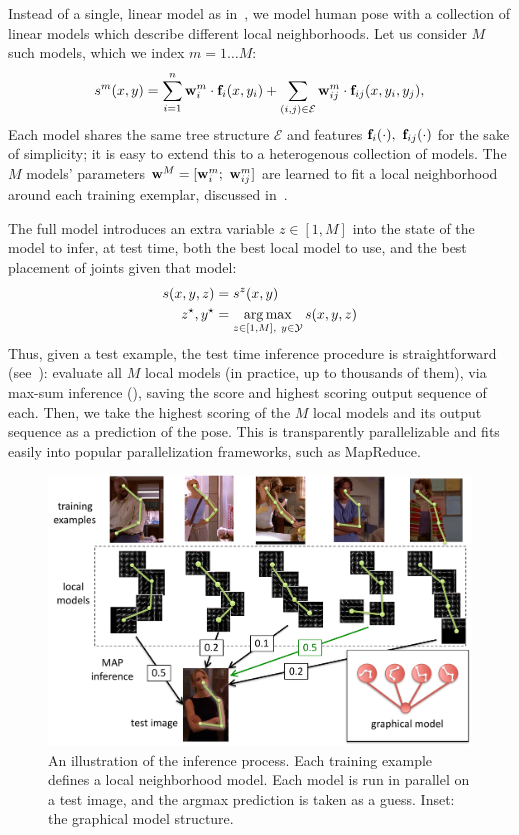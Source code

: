 Instead of a single, linear model as in~, we model human pose 
with a collection of linear models which describe different local 
neighborhoods.  Let us consider $M$ such models, which we index $m = 1 \ldots 
M$:
\begin{align}
s^m(x,y) = \sum_{i=1}^n \mathbf{w}^m_i \cdot \mathbf{f}_i(x,y_i) + \sum_{(i,j) \in \mathcal{E}} 
\mathbf{w}^m_{ij} \cdot \mathbf{f}_{ij}(x,y_i,y_j),
\end{align}
Each model shares the same tree structure $\mathcal{E}$ and features 
$\mathbf{f}_i(\cdot),~\mathbf{f}_{ij}(\cdot)$ for the sake of simplicity; it is easy to extend 
this to a heterogenous collection of models.  The $M$ models' parameters $\mathbf{w}^M 
= [\mathbf{w}^m_i;~\mathbf{w}^m_{ij}]$ are learned to fit a local neighborhood around each 
training exemplar, discussed in~.

The full \LLPS model introduces an extra variable $z \in [1,M]$ into the state 
of the model to infer, at test time, both the best local model to use, and the 
best placement of joints given that model:
\begin{align}
s(x,y,z) &= s^z(x,y) \\
z^\star,y^\star &= \mathop{\arg\max}_{z \in [1,M],~y \in \mathcal{Y}} s(x,y,z) 
\end{align}
Thus, given a test example, the test time inference procedure is 
straightforward (see~): evaluate all $M$ local models 
(in practice, up to thousands of them), via max-sum inference 
(), saving the score and highest scoring output sequence of 
each.  Then, we take the highest scoring of the $M$ local models and its output 
sequence as a prediction of the pose.  This is transparently parallelizable and 
fits easily into popular parallelization frameworks, such as MapReduce.

\begin{figure}[tb!]
\centering
\includegraphics[width=0.99\linewidth]{figs/llps-inference.pdf}
\caption[LLPS inference.]{\label{fig:llps-inference} An illustration of the 
inference process.  Each training example defines a local neighborhood model.  
Each model is run in parallel on a test image, and the argmax prediction is 
taken as a guess. Inset: the graphical model structure.}
\end{figure}

